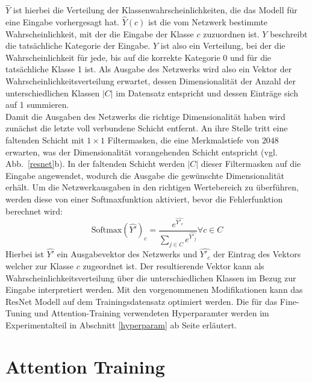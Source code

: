 $\hat{Y}$ ist hierbei die Verteilung der Klassenwahrscheinlichkeiten, die das Modell für eine Eingabe vorhergesagt hat. $\hat{Y}(c)$ ist die vom Netzwerk bestimmte Wahrscheinlichkeit, mit der die Eingabe der Klasse $c$ zuzuordnen ist. $Y$ beschreibt die tatsächliche Kategorie der Eingabe. $Y$ ist also ein Verteilung, bei der die Wahrscheinlichkeit für jede, bis auf die korrekte Kategorie 0 und für die tatsächliche Klasse 1 ist. Als Ausgabe des Netzwerks wird also ein Vektor der Wahrscheinlichkeitsverteilung erwartet, dessen Dimensionalität der Anzahl der unterschiedlichen Klassen $|C|$ im Datensatz entspricht und dessen Einträge sich auf 1 summieren. \\
Damit die Ausgaben des Netzwerks die richtige Dimensionalität haben wird zunächst die letzte voll verbundene Schicht entfernt. An ihre Stelle tritt eine faltenden Schicht mit $1\times1$ Filtermasken, die eine Merkmalstiefe von $2048$ erwarten, was der Dimensionalität vorangehenden Schicht entspricht (vgl. Abb.~\ref{resnet}b). In der faltenden Schicht werden $|C|$ dieser Filtermasken auf die Eingabe angewendet, wodurch die Ausgabe die gewünschte Dimensionalität erhält.
Um die Netzwerkausgaben in den richtigen Wertebereich zu überführen, werden diese von einer Softmaxfunktion aktiviert, bevor die Fehlerfunktion berechnet wird:
\begin{equation}
\text{Softmax}(\hat{Y'})_{c} = \frac{e^{\hat{Y'_c}}}{\sum_{ j \in C}{e^{\hat{Y'_j}}}} \forall c \in C
\end{equation}
Hierbei ist $\hat{Y'}$ ein Ausgabevektor des Netzwerks und $\hat{Y'_c}$ der Eintrag des Vektors welcher zur Klasse $c$ zugeordnet ist. Der resultierende Vektor kann als Wahrscheinlichkeitsverteilung über die unterschiedlichen Klassen im Bezug zur Eingabe interpretiert werden. Mit den vorgenommenen Modifikationen kann das ResNet Modell auf dem Trainingsdatensatz optimiert werden. Die für das Fine-Tuning und Attention-Training verwendeten Hyperparamter werden im Experimentalteil in Abschnitt \ref{hyperparam} ab Seite \pageref{hyperparam} erläutert.

\section{Attention Training}

